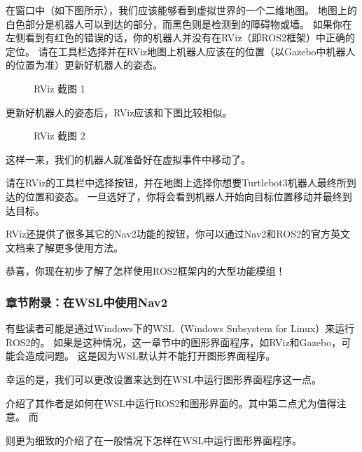 \documentclass[letterpaper,10pt,english]{sphinxmanual}
\begin{document}
\sphinxAtStartPar
在窗口中（如下图所示），我们应该能够看到虚拟世界的一个二维地图。
地图上的白色部分是机器人可以到达的部分，而黑色则是检测到的障碍物或墙。
如果你在左侧看到有红色的错误的话，你的机器人并没有在RViz（即ROS2框架）中正确的定位。
请在工具栏选择并在RViz地图上机器人应该在的位置（以Gazebo中机器人的位置为准）更新好机器人的姿态。

\begin{figure}[H]
\centering
\capstart

\noindent{}
\caption{RViz 截图 1}\label{\detokenize{chapter_rl_sys/control_code_ex:id5}}\end{figure}

\sphinxAtStartPar
更新好机器人的姿态后，RViz应该和下图比较相似。

\begin{figure}[H]
\centering
\capstart

\noindent{}
\caption{RViz 截图 2}\label{\detokenize{chapter_rl_sys/control_code_ex:id6}}\end{figure}

\sphinxAtStartPar
这样一来，我们的机器人就准备好在虚拟事件中移动了。

\sphinxAtStartPar
请在RViz的工具栏中选择按钮，并在地图上选择你想要Turtlebot3机器人最终所到达的位置和姿态。
一旦选好了，你将会看到机器人开始向目标位置移动并最终到达目标。

\sphinxAtStartPar
RViz还提供了很多其它的Nav2功能的按钮，你可以通过Nav2和ROS2的官方英文文档来了解更多使用方法。

\sphinxAtStartPar
恭喜，你现在初步了解了怎样使用ROS2框架内的大型功能模组！


\subsubsection{章节附录：在WSL中使用Nav2}
\label{\detokenize{chapter_rl_sys/control_code_ex:wslnav2}}
\sphinxAtStartPar
有些读者可能是通过Windows下的WSL（Windows Subsystem for
Linux）来运行ROS2的。
如果是这种情况，这一章节中的图形界面程序，如RViz和Gazebo，可能会造成问题。
这是因为WSL默认并不能打开图形界面程序。

\sphinxAtStartPar
幸运的是，我们可以更改设置来达到在WSL中运行图形界面程序这一点。
%
\begin{footnote}[101]\sphinxAtStartFootnote
{}
%
\end{footnote}介绍了其作者是如何在WSL中运行ROS2和图形界面的。其中第二点尤为值得注意。
而%
\begin{footnote}[102]\sphinxAtStartFootnote
{}
%
\end{footnote}则更为细致的介绍了在一般情况下怎样在WSL中运行图形界面程序。
\end{document}
